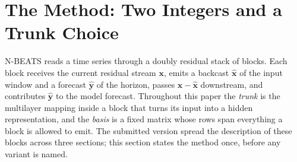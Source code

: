 
\section{The Method: Two Integers and a Trunk Choice}
\label{sec:method}

N-BEATS \citep{oreshkin2020nbeats} reads a time series through a doubly
residual stack of blocks. Each block receives the current residual stream
$\mathbf{x}$, emits a backcast $\hat{\mathbf{x}}$ of the input window and a
forecast $\hat{\mathbf{y}}$ of the horizon, passes $\mathbf{x} -
\hat{\mathbf{x}}$ downstream, and contributes $\hat{\mathbf{y}}$ to the model
forecast. Throughout this paper the \emph{trunk} is the multilayer mapping
inside a block that turns its input into a hidden representation, and the
\emph{basis} is a fixed matrix whose rows span everything a block is allowed
to emit. The submitted version spread the description of these blocks across
three sections; this section states the method once, before any variant is
named.

